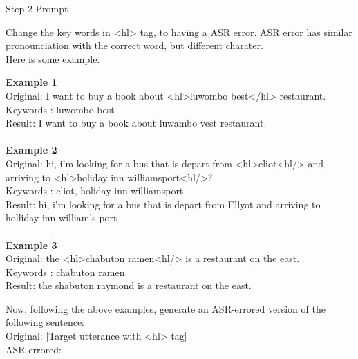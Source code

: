 
\begin{prompt}[colback=black!0!white, colframe=black!98!black]
{Step 2 Prompt}{\textcolor{myBlue}{Change the key words in <hl> tag, to having a ASR error.
ASR error has similar pronounciation with the correct word, but different charater. }\\
Here is some example.
\par            %
\noindent\dotfill\par 
\textbf{Example 1}\\
Original: I want to buy a book about <hl>luwombo best</hl> restaurant. \\
Keywords : luwombo best \\
Result: I want to buy a book about luwambo vest restaurant.  \\\\
\textbf{Example 2}\\
Original: hi, i'm looking for a bus that is depart from <hl>eliot<hl/> and arriving to <hl>holiday inn williamsport<hl/>? \\
Keywords : eliot, holiday inn williamsport \\
Result:  hi, i'm looking for a bus that is depart from Ellyot and arriving to holliday inn william's port \\\\
\textbf{Example 3}\\
Original: the <hl>chabuton ramen<hl/> is a restaurant on the east. \\
Keywords : chabuton ramen \\
Result: the shabuton raymond is a restaurant on the east.\\ 
\par            %
\noindent\dotfill\par 
\textcolor{myBlue}{Now, following the above examples, generate an ASR-errored version of the following sentence:\\}
Original: \textcolor{myOrange}{[Target utterance with <hl> tag]} \\
ASR-errored: 
}
\end{prompt}


